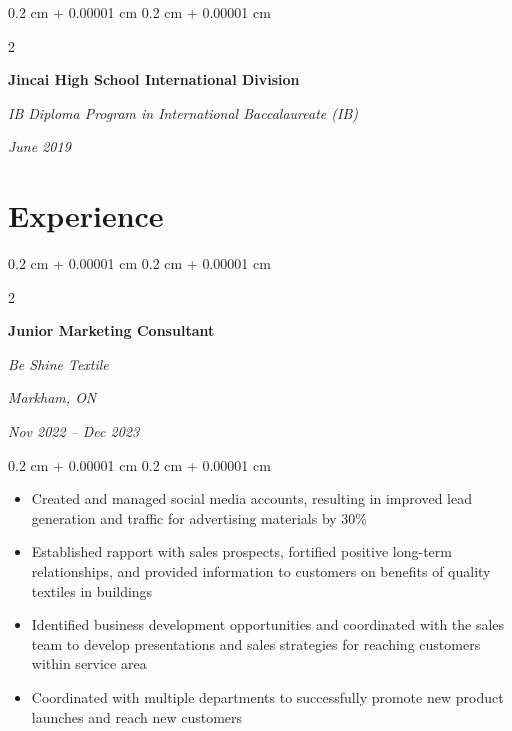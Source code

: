 \documentclass[10pt, letterpaper]{article}
\newenvironment{highlights}{
    \begin{itemize}[
        topsep=0.10 cm,
        parsep=0.10 cm,
        partopsep=0pt,
        itemsep=0pt,
        leftmargin=0.4 cm + 10pt
    ]
}{
    \end{itemize}
} %
\newenvironment{onecolentry}{
    \begin{adjustwidth}{
        0.2 cm + 0.00001 cm
    }{
        0.2 cm + 0.00001 cm
    }
}{
    \end{adjustwidth}
} %
\newenvironment{twocolentry}[2][]{
    \onecolentry
    \def\secondColumn{#2}
    \setcolumnwidth{\fill, 4.5 cm}
    \begin{paracol}{2}
}{
    \switchcolumn \raggedleft \secondColumn
    \end{paracol}
    \endonecolentry
} %
\begin{document}
        \vspace{0.2 cm}

        \begin{twocolentry}{
            
            
        \textit{June 2019}}
            \textbf{Jincai High School International Division}

            \textit{IB Diploma Program in International Baccalaureate (IB)}
        \end{twocolentry}




    
    \section{Experience}



        
        \begin{twocolentry}{
        \textit{Markham, ON}    
            
        \textit{Nov 2022 – Dec 2023}}
            \textbf{Junior Marketing Consultant}
            
            \textit{Be Shine Textile}
        \end{twocolentry}

        \vspace{0.10 cm}
        \begin{onecolentry}
            \begin{highlights}
                \item Created and managed social media accounts, resulting in improved lead generation and traffic for advertising materials by 30\%
                \item Established rapport with sales prospects, fortified positive long-term relationships, and provided information to customers on benefits of quality textiles in buildings
                \item Identified business development opportunities and coordinated with the sales team to develop presentations and sales strategies for reaching customers within service area
                \item Coordinated with multiple departments to successfully promote new product launches and reach new customers
            \end{highlights}
        \end{onecolentry}


        \vspace{0.2 cm}
\end{document}
